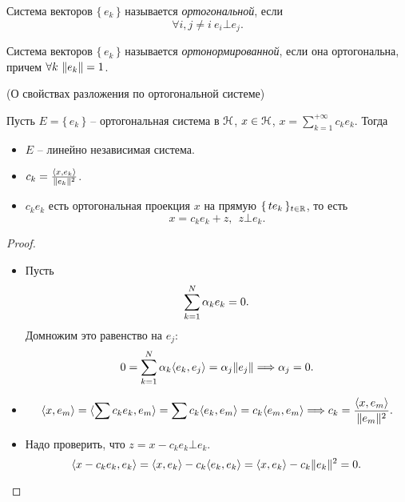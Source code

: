 \begin{definition}
    Система векторов $\{\,e_k\,\}$ называется \textit{ортогональной},
    если
    \[
        \forall i, j \neq i~ e_i \bot e_j
    .\]
\end{definition}

\begin{definition}
    Система векторов $\{\,e_k\,\}$ называется \textit{ортонормированной},
    если она ортогональна, причем $\forall k~ \lVert e_k\rVert = 1$.
\end{definition}

\begin{theorem}(О свойствах разложения по ортогональной системе)
    
    Пусть $E = \{\,e_k\,\}$ -- ортогональная система в $\mathcal{H}$, $x \in \mathcal{H}$,
    $x = \sum_{k = 1}^{+\infty}{c_k e_k}$. Тогда
    \begin{itemize}
        \item $E$ -- линейно независимая система.
        \item \label{th:Hortho:2} $c_k = \frac{\langle x, e_k \rangle}{\lVert e_k\rVert^2}$.
        \item $c_k e_k$ есть ортогональная проекция $x$ на прямую
            $\{\,t e_k\,\}_{t \in \mathbb{R}}$, то есть
            \[
                x = c_k e_k + z,~~ z \bot e_k
            .\]
    \end{itemize}
\end{theorem}
\begin{proof}
    \enewline
    \begin{itemize}
        \item Пусть
            \[
                \sum_{k = 1}^N{\alpha_k e_k} = 0
            .\]
            Домножим это равенство на $e_j$:
            \[
                0 = \sum_{k = 1}^N{\alpha_k \langle e_k, e_j \rangle} = \alpha_j \lVert e_j\rVert \Longrightarrow
                \alpha_j = 0
            .\]
        \item
            \begin{align*}
                \langle x, e_m \rangle = \langle \sum{c_k e_k}, e_m \rangle = \sum{c_k \langle e_k, e_m \rangle} =
                c_k \langle e_m, e_m \rangle \Longrightarrow c_k = \frac{\langle x, e_m \rangle}{\lVert e_m\rVert^2}
            .\end{align*}
        \item Надо проверить, что $z = x - c_k e_k \bot e_k$.
            \[
                \langle x - c_k e_k, e_k \rangle = \langle x, e_k \rangle - c_k \langle e_k, e_k \rangle =
                \langle x, e_k \rangle - c_k \lVert e_k\rVert^2 = 0
            .\]
    \end{itemize}
\end{proof}

